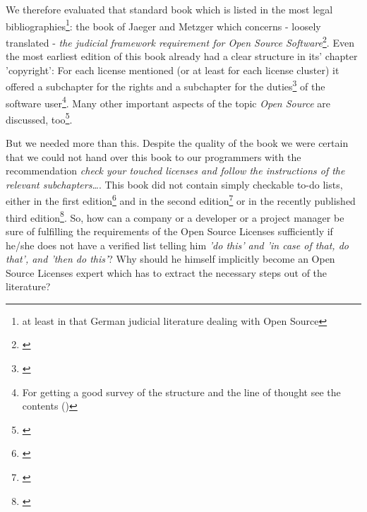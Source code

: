 We therefore evaluated that standard book which is listed in the most legal
bibliographies\footnote{at least in that German judicial literature dealing with
Open Source}: the book of Jaeger and Metzger which concerns - loosely translated
- \textit{the judicial framework requirement for Open Source
Software}\footnote{\cite[cf.][V - It can not be any surprise that both authors,
Mr. Jaeger and Mr. Metzger are members of ifross (cf.
\texttt{http://www.ifross.org/personen/}, wp.)]{JaeMet2002a}}. Even the most
earliest edition of this book already had a clear structure in its' chapter
'copyright': For each license mentioned (or at least for each license cluster)
it offered a subchapter for the rights and a subchapter for the
duties\footnote{\cite[cf.][30ff]{JaeMet2002a}} of the software user\footnote{For
getting a good survey of the structure and the line of thought see the contents
(\cite[cf.][VIIIf]{JaeMet2002a})}. Many other important aspects of the topic
\textit{Open Source} are discussed, too\footnote{\cite[pars pro toto: have a
look at the chapter concerning the liability: cf.][137ff]{JaeMet2002a}}.

But we needed more than this. Despite the quality of the book we were certain
that we could not hand over this book to our programmers with the recommendation
\textit{check your touched licenses and follow the instructions of the relevant
subchapters\ldots}. This book did not contain simply checkable to-do lists,
either in the first edition\footnote{\cite[cf.][VIff]{JaeMet2002a}} and in the
second edition\footnote{\cite[cf.][VIIff]{JaeMet2006a}} or in the recently
published third edition\footnote{\cite[cf.][VIIIff. Naturally we use this latest
edition for adopting or discussing systematical aspects]{JaeMet2011a}}. So, how
can a company or a developer or a project manager be sure of fulfilling the
requirements of the Open Source Licenses sufficiently if he/she does not have a
verified list telling him \textit{'do this' and 'in case of that, do that', and
'then do this'}? Why should he himself implicitly become an Open Source Licenses
expert which has to extract the necessary steps out of the literature?

%
